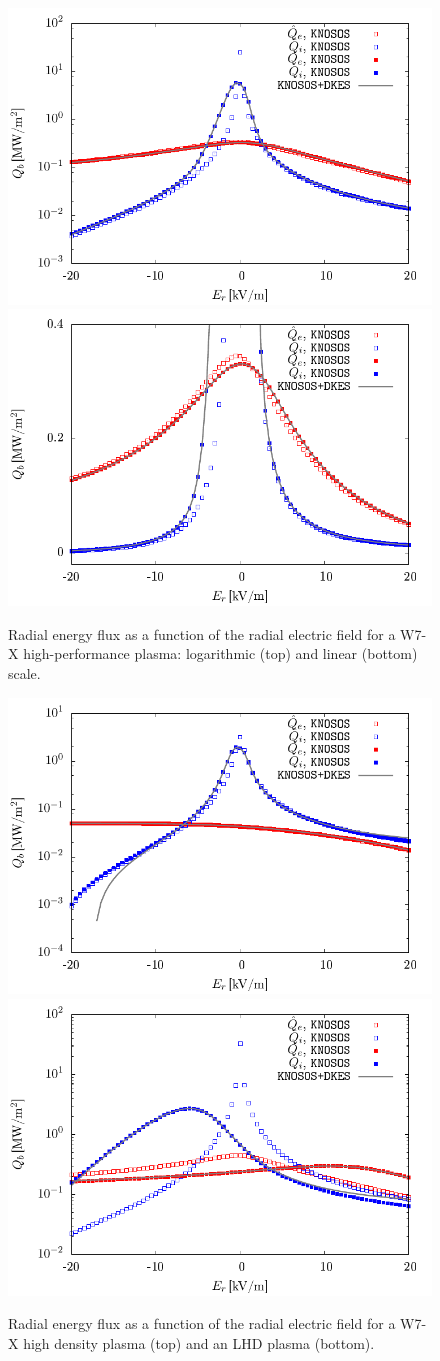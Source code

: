\begin{figure}
\centering
\includegraphics[angle=0,width=0.6\columnwidth]{figures/QEr.pdf}
\includegraphics[angle=0,width=0.6\columnwidth]{figures/QEr_nolog.pdf}
\caption{Radial energy flux as a function of the radial electric field for a W7-X high-performance plasma: logarithmic (top) and linear (bottom) scale.}
\label{FIG_QER1}
\end{figure}

\begin{figure}
\centering
\includegraphics[angle=0,width=0.6\columnwidth]{figures/QEr_highn.pdf}
\includegraphics[angle=0,width=0.6\columnwidth]{figures/QEr_lhd.pdf}
\caption{Radial energy flux as a function of the radial electric field for a W7-X high density plasma (top) and an LHD plasma (bottom).}
\label{FIG_QER2}
\end{figure}

